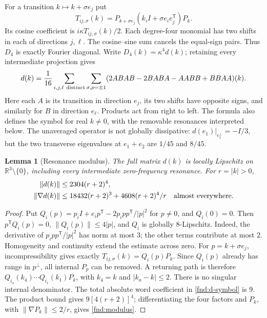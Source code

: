 \documentclass[11pt,a4paper]{amsart}
\newtheorem{lemma}[theorem]{Lemma}
\theoremstyle{definition}
\theoremstyle{remark}
\numberwithin{equation}{section}
\begin{document}
For a transition $k\mapsto k+\sigma e_j$ put
\begin{equation}
 T_{ij,\sigma}(k)=P_{k+\sigma e_j}
          (k_iI+\sigma e_ie_j^{\mathsf T})P_k.
 \label{fnd:transition}
\end{equation}
Its cosine coefficient is $i\kappa T_{ij,\sigma}(k)/2$. Each degree-four
monomial has two shifts in each of directions $j,\ell$. The cosine--sine sum
cancels the equal-sign pairs. Thus $D_4$ is exactly Fourier diagonal. Write
$D_4(k)=\kappa^4d(k)$; retaining every intermediate projection gives
\begin{equation}
 d(k)=\frac1{16}\sum_{i,j,\ell\ {\rm distinct}}
       \sum_{\sigma,\rho=\pm1}
       (2ABAB-2BABA-AABB+BBAA)(k).
 \label{fnd:d-symbol}
\end{equation}
Here each $A$ is its transition in direction $e_j$, its two shifts have opposite
signs, and similarly for $B$ in direction $e_\ell$. Products act from right to
left. The formula also defines the symbol for real $k\ne0$, with the removable
resonances interpreted below. The unaveraged operator is not globally
dissipative: $d(e_1)|_{e_1^\perp}=-I/3$, but the two transverse eigenvalues at
$e_1+e_2$ are $1/45$ and $8/45$.

\begin{lemma}[Resonance modulus]\label{fnd:resonance}
The full matrix $d(k)$ is locally Lipschitz on $\mathbb R^3\setminus\{0\}$,
including every intermediate zero-frequency resonance. For $r=|k|>0$,
\begin{align}
 \|d(k)\|&\le2304(r+2)^4,\notag\\
 \|\nabla d(k)\|&\le18432(r+2)^3+4608(r+2)^4/r
 \quad\hbox{almost everywhere}.
 \label{fnd:modulus}
\end{align}
\end{lemma}
\begin{proof}
Put $Q_i(p)=p_iI+e_ip^{\mathsf T}-2p_i pp^{\mathsf T}/|p|^2$ for $p\ne0$,
and $Q_i(0)=0$. Then $p^{\mathsf T}Q_i(p)=0$, $\|Q_i(p)\|\le4|p|$, and
$Q_i$ is globally $8$-Lipschitz. Indeed, the derivative of
$p_i pp^{\mathsf T}/|p|^2$ has norm at most $3$; the other terms contribute at
most $2$. Homogeneity and continuity extend the estimate across zero.
For $p=k+\sigma e_j$, incompressibility gives exactly
$T_{ij,\sigma}(k)=Q_i(p)P_k$. Since $Q_i(p)$ already has range in $p^\perp$,
all internal $P_p$ can be removed. A returning path is therefore
$Q_{i_4}(k_4)\cdots Q_{i_1}(k_1)P_k$, with $k_4=k$ and $|k_a-k|\le2$.
There is no singular internal denominator. The total absolute word coefficient
in \eqref{fnd:d-symbol} is $9$. The product bound gives $9[4(r+2)]^4$;
differentiating the four factors and $P_k$, with $\|\nabla P_k\|\le2/r$, gives
\eqref{fnd:modulus}.
\end{proof}
\end{document}
